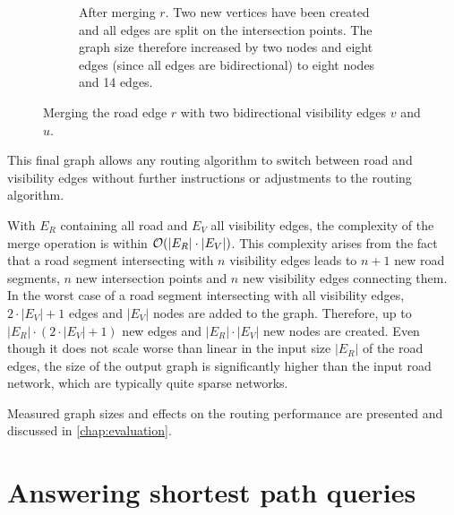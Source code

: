 \begin{figure}[h]
\begin{figcenter}
\begin{subfigure}[t]{.48\textwidth}
\begin{figcenter}
					\end{figcenter}
					\caption{
						After merging $r$. Two new vertices have been created and all edges are split on the intersection points. The graph size therefore increased by two nodes and eight edges (since all edges are bidirectional) to eight nodes and 14 edges.
					}
					\label{fig:merging-edges-b}
				\end{subfigure}
			\end{figcenter}
			\caption{
				Merging the road edge $r$ with two bidirectional visibility edges $v$ and $u$.
			}
			\label{fig:merging-edges}
		\end{figure}
	
		This final graph allows any routing algorithm to switch between road and visibility edges without further instructions or adjustments to the routing algorithm.
		

		With $E_R$ containing all road and $E_V$ all visibility edges, the complexity of the merge operation is within $\mathcal{O}(|E_R| \cdot |E_V|)$.
		This complexity arises from the fact that a road segment intersecting with $n$ visibility edges leads to $n+1$ new road segments, $n$ new intersection points and $n$ new visibility edges connecting them.
		In the worst case of a road segment intersecting with all visibility edges, $2 \cdot |E_V| + 1$ edges and $|E_V|$ nodes are added to the graph.
		Therefore, up to $|E_R| \cdot (2 \cdot |E_V| + 1)$ new edges and $|E_R| \cdot |E_V|$ new nodes are created.
		Even though it does not scale worse than linear in the input size $|E_R|$ of the road edges, the size of the output graph is significantly higher than the input road network, which are typically quite sparse networks.

		Measured graph sizes and effects on the routing performance are presented and discussed in \cref{chap:evaluation}.
	
\section{Answering shortest path queries}
\label{sec:answering-queries}

